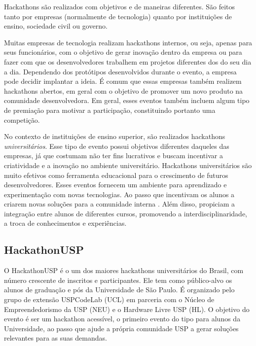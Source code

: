 \documentclass[10pt,twoside,a4paper]{article}
\begin{document}
    Hackathons são realizados com objetivos e de maneiras diferentes. São feitos tanto por empresas (normalmente de tecnologia) quanto por instituições de ensino, sociedade civil ou governo.
    
    Muitas empresas de tecnologia realizam hackathons internos, ou seja, apenas para seus funcionários, com o objetivo de gerar inovação dentro da empresa ou para fazer com que os desenvolvedores trabalhem em projetos diferentes dos do seu dia a dia. Dependendo dos protótipos desenvolvidos durante o evento, a empresa pode decidir implantar a ideia. É comum que essas empresas também realizem hackathons abertos, em geral com o objetivo de promover um novo produto na comunidade desenvolvedora. Em geral, esses eventos também incluem algum tipo de premiação para motivar a participação, constituindo portanto uma competição.
    
    No contexto de instituições de ensino superior, são realizados hackathons \textit{universitários}. Esse tipo de evento possui objetivos diferentes daqueles das empresas, já que costumam não ter fins lucrativos e buscam incentivar a criatividade e a inovação no ambiente universitário. Hackathons universitários são muito efetivos como ferramenta educacional para o crescimento de futuros desenvolvedores. Esses eventos fornecem um ambiente para aprendizado e experimentação com novas tecnologias. Ao passo que incentivam os alunos a criarem novas soluções para a comunidade interna \cite{Kayastha2017EnablingCompetition}. Além disso, propiciam a integração entre alunos de diferentes cursos, promovendo a interdisciplinaridade, a troca de conhecimentos e experiências.

  \subsection{HackathonUSP}
    
    O HackathonUSP é o um dos maiores hackathons universitários do Brasil, com número crescente de inscritos e participantes. Ele tem como  público-alvo os alunos de graduação e pós da Universidade de São Paulo. É organizado pelo grupo de extensão USPCodeLab (UCL) em parceria com o Núcleo de Empreendedorismo da USP (NEU) e o Hardware Livre USP (HL). O objetivo do evento é ser um hackathon acessível, o primeiro evento do tipo para alunos da Universidade, ao passo que ajude a própria comunidade USP a gerar soluções relevantes para as suas demandas.
    
\end{document}
